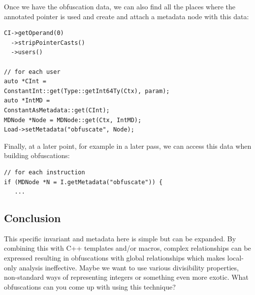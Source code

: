 \documentclass[twocolumn]{article}
\begin{document}
Once we have the obfuscation data, we can also find all the places where the annotated pointer is used and create and attach a metadata node with this data:

\begin{verbatim}
CI->getOperand(0)
  ->stripPointerCasts()
  ->users()

// for each user
auto *CInt = 
ConstantInt::get(Type::getInt64Ty(Ctx), param);
auto *IntMD = 
ConstantAsMetadata::get(CInt);
MDNode *Node = MDNode::get(Ctx, IntMD);
Load->setMetadata("obfuscate", Node);

\end{verbatim}

Finally, at a later point, for example in a later pass, we can access this data when building obfuscations:

\begin{verbatim}
// for each instruction
if (MDNode *N = I.getMetadata("obfuscate")) {
   ...
\end{verbatim}

\vspace*{-0.5\baselineskip}
\subsection*{Conclusion}

This specific invariant and metadata here is simple but can be expanded. By combining this with C++ templates and/or macros, complex relationships can be expressed resulting in obfuscations with global relationships which makes local-only analysis ineffective. Maybe we want to use various divisibility properties, non-standard ways of representing integers or something even more exotic. What obfuscations can you come up with using this technique?

\end{document}

